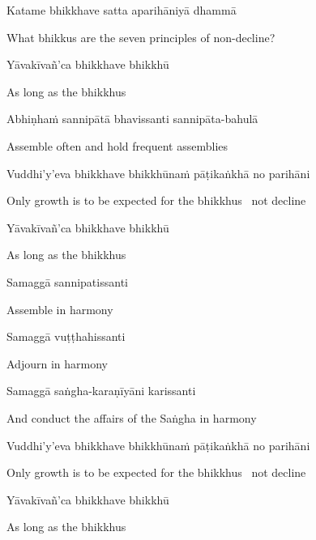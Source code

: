 Katame bhikkhave satta aparihāniyā dhammā

\begin{english}
  What bhikkus are the seven principles of non-decline?
\end{english}

Yāvakīvañ'ca bhikkhave bhikkhū

\begin{english}
  As long as the bhikkhus
\end{english}

Abhiṇhaṁ sannipātā bhavissanti sannipāta-bahulā

\begin{english}
  Assemble often and hold frequent assemblies
\end{english}

Vuddhi'y'eva bhikkhave bhikkhūnaṁ pāṭikaṅkhā no parihāni

\begin{english}
  Only growth is to be expected for the bhikkhus \breathmark\ not decline
\end{english}

Yāvakīvañ'ca bhikkhave bhikkhū

\begin{english}
  As long as the bhikkhus
\end{english}

Samaggā sannipatissanti

\begin{english}
  Assemble in harmony
\end{english}

Samaggā vuṭṭhahissanti

\begin{english}
  Adjourn in harmony
\end{english}

Samaggā saṅgha-karaṇīyāni karissanti

\begin{english}
  And conduct the affairs of the Saṅgha in harmony
\end{english}

Vuddhi'y'eva bhikkhave bhikkhūnaṁ pāṭikaṅkhā no parihāni

\begin{english}
  Only growth is to be expected for the bhikkhus \breathmark\ not decline
\end{english}

Yāvakīvañ'ca bhikkhave bhikkhū

\begin{english}
  As long as the bhikkhus
\end{english}

